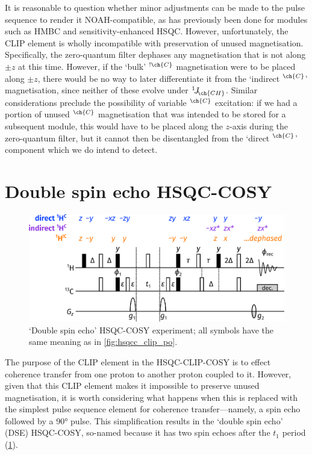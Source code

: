\documentclass[a4paper,12pt]{article}
\newcommand{\magn}[1]{\ch{^1H}$^{\ch{#1}}$}
\newcommand{\magnnot}[1]{\ch{^1H}$^{!\ch{#1}}$}
\newcommand{\oneJ}[1]{{}^{1}\!J_{\!\ch{#1}}}
\begin{document}
\begin{refsection}
It is reasonable to question whether minor adjustments can be made to the pulse sequence to render it NOAH-compatible, as has previously been done for modules such as HMBC\autocite{Claridge2019MRC,Kupce2019JMR} and sensitivity-enhanced HSQC\autocite{Hansen2021AC,Yong2021JMR}.
However, unfortunately, the CLIP element is wholly incompatible with preservation of unused magnetisation.
Specifically, the zero-quantum filter dephases any magnetisation that is not along $\pm z$ at this time.
However, if the `bulk' \magnnot{C} magnetisation were to be placed along $\pm z$, there would be no way to later differentiate it from the `indirect \magn{C}' magnetisation, since neither of these evolve under $\oneJ{CH}$.
Similar considerations preclude the possibility of variable \magn{C} excitation: if we had a portion of unused \magn{C} magnetisation that was intended to be stored for a subsequent module, this would have to be placed along the $z$-axis during the zero-quantum filter, but it cannot then be disentangled from the `direct \magn{C}' component which we do intend to detect.

\section{Double spin echo HSQC-COSY}

\begin{figure}[!ht]
    \centering
    \includegraphics[]{dse_po.png}%
    \caption[Double spin echo HSQC-COSY experiment]{
        `Double spin echo' HSQC-COSY experiment; all symbols have the same meaning as in \cref{fig:hsqcc_clip_po}.
    }
    \label{fig:hsqcc_dse_po}
\end{figure}

The purpose of the CLIP element in the HSQC-CLIP-COSY is to effect coherence transfer from one proton to another proton coupled to it.
However, given that this CLIP element makes it impossible to preserve unused magnetisation, it is worth considering what happens when this is replaced with the simplest pulse sequence element for coherence transfer---namely, a spin echo followed by a \ang{90} pulse.
This simplification results in the `double spin echo' (DSE) HSQC-COSY, so-named because it has two spin echoes after the $t_1$ period (\cref{fig:hsqcc_dse_po}).


\end{refsection}
\end{document}
